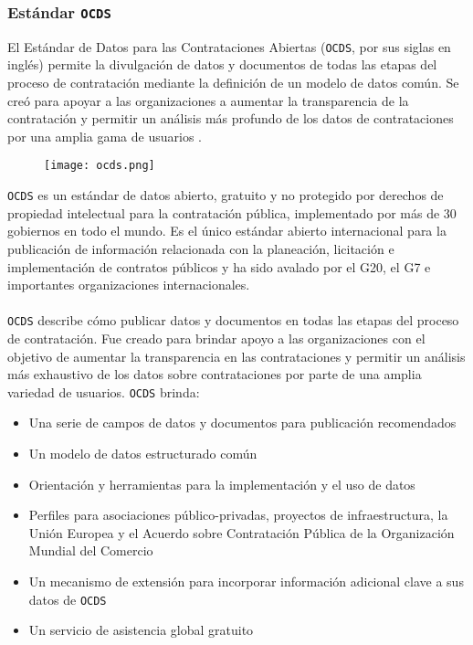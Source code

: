         \subsubsection{Estándar \texttt{OCDS}}
            El Estándar de Datos para las Contrataciones Abiertas (\texttt{OCDS}, por sus siglas en inglés) permite la divulgación de datos y documentos de todas las etapas del proceso de contratación mediante la definición de un modelo de datos común. Se creó para apoyar a las organizaciones a aumentar la transparencia de la contratación y permitir un análisis más profundo de los datos de contrataciones por una amplia gama de usuarios \cite{OCDS}.
        
            \begin{figure}[h]
                \centering
                \texttt{[image: ocds.png]}
            \end{figure}
            
            \noindent \texttt{OCDS} es un estándar de datos abierto, gratuito y no protegido por derechos de propiedad intelectual para la contratación pública, implementado por más de 30 gobiernos en todo el mundo. Es el único estándar abierto internacional para la publicación de información relacionada con la planeación, licitación e implementación de contratos públicos y ha sido avalado por el G20, el G7 e importantes organizaciones internacionales.
            \\ \\
            \texttt{OCDS} describe cómo publicar datos y documentos en todas las etapas del proceso de contratación. Fue creado para brindar apoyo a las organizaciones con el objetivo de aumentar la transparencia en las contrataciones y permitir un análisis más exhaustivo de los datos sobre contrataciones por parte de una amplia variedad de usuarios. \texttt{OCDS} brinda:
            
            \begin{itemize}
                \item Una serie de campos de datos y documentos para publicación recomendados
                \item Un modelo de datos estructurado común
                \item Orientación y herramientas para la implementación y el uso de datos
                \item Perfiles para asociaciones público-privadas, proyectos de infraestructura, la Unión Europea y el Acuerdo sobre Contratación Pública de la Organización Mundial del Comercio
                \item Un mecanismo de extensión para incorporar información adicional clave a sus datos de \texttt{OCDS}
                \item Un servicio de asistencia global gratuito
            \end{itemize}
            
